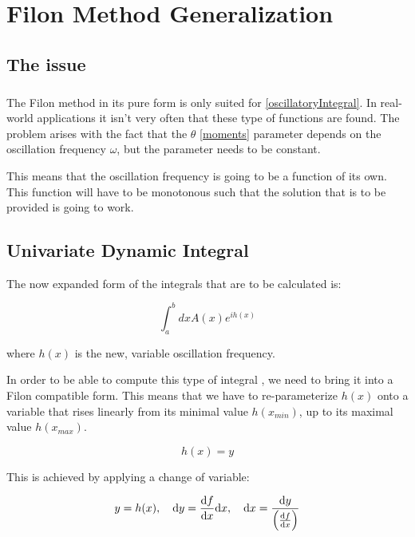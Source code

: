\chapter{Filon Method Generalization}

\section{The issue}

\paragraph{} The Filon method in its pure form is only suited for \eqref{oscillatoryIntegral}.
In real-world applications it isn't very often that these type of functions are found. The problem arises with the fact that the $\theta$ \eqref{moments} parameter depends on the oscillation frequency $\omega$, but the parameter needs to be constant.

This means that the oscillation frequency is going to be a function of its own. This function will have to be monotonous such that the solution that is to be provided is going to work. 

\section{Univariate Dynamic Integral}

The now expanded form of the integrals that are to be calculated is:

\begin{equation}
    \int_{a}^{b}dxA(x)e^{ih(x)}
\end{equation}

where $h(x)$ is the new, variable oscillation frequency.

In order to be able to compute this type of integral \cite{book1}, we need to bring it into a Filon compatible form. This means that we have to re-parameterize $h(x)$ onto a variable that rises linearly from its minimal value $h(x_{min})$, up to its maximal value $h(x_{max})$.

\begin{equation}
    h(x)=y \label{parameterization}   
\end{equation}

This is achieved by applying a change of variable:

\begin{equation}
    y=h(x), \quad \dd y=\dv{f}{x} \dd x, \quad \dd x=\frac{\dd y}{\left(\dv{f}{x}\right)} \label{changeOfVariable}
\end{equation}

